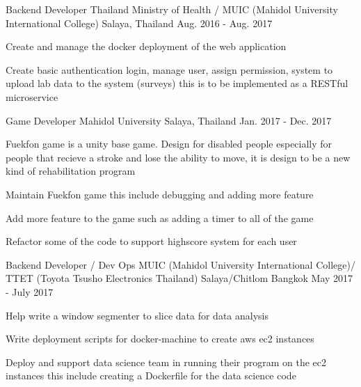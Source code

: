 

\begin{cventries}

  \cventry
    {Backend Developer} %
    {Thailand Ministry of Health / MUIC (Mahidol University International College)} %
    {Salaya, Thailand} %
    {Aug. 2016 - Aug. 2017} %
    {
      \begin{cvitems} %
        \item {Create and manage the docker deployment of the web application}
        \item {Create basic authentication login, manage user, assign permission, system to upload lab data to the system (surveys) this is to be implemented as a RESTful microservice}
      \end{cvitems}
    }

  \cventry
    {Game Developer} %
    {Mahidol University} %
    {Salaya, Thailand} %
    {Jan. 2017 - Dec. 2017} %
    {
      \begin{cvitems} %
        \item {Fuekfon game is a unity base game. Design for disabled people especially for people that recieve a stroke and lose the ability to move, it is design to be a new kind of rehabilitation program}
        \item {Maintain Fuekfon game this include debugging and adding more feature}
        \item {Add more feature to the game such as adding a timer to all of the game}
        \item {Refactor some of the code to support highscore system for each user}
      \end{cvitems}
    }

  \cventry
    {Backend Developer / Dev Ops} %
    {MUIC (Mahidol University International College)/ TTET (Toyota Tsusho Electronics Thailand)} %
    {Salaya/Chitlom Bangkok} %
    {May 2017 - July 2017} %
    {
      \begin{cvitems} %
        \item {Help write a window segmenter to slice data for data analysis}
        \item {Write deployment scripts for docker-machine to create aws ec2 instances}
        \item {Deploy and support data science team in running their program on the ec2 instances this include creating a Dockerfile for the data science code}
      \end{cvitems}
    }


\end{cventries}
